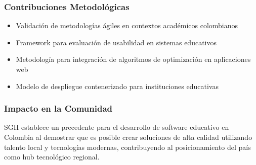 \subsubsection{Contribuciones Metodológicas}

\begin{itemize}
\item Validación de metodologías ágiles en contextos académicos colombianos
\item Framework para evaluación de usabilidad en sistemas educativos
\item Metodología para integración de algoritmos de optimización en aplicaciones web
\item Modelo de despliegue contenerizado para instituciones educativas
\end{itemize}

\subsubsection{Impacto en la Comunidad}

SGH establece un precedente para el desarrollo de software educativo en Colombia al demostrar que es posible crear soluciones de alta calidad utilizando talento local y tecnologías modernas, contribuyendo al posicionamiento del país como hub tecnológico regional.